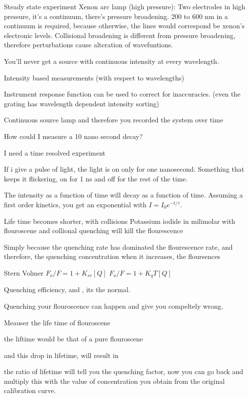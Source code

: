 	Steady state experiment
	Xenon arc lamp (high pressure): Two electrodes in high pressure, it's a continuum, there's pressure broadening. 200 to 600 nm in a continuum is required, because otherwise, the lines would correspond be xenon's electronic levels. Collisional broadening is different from pressure broadening, therefore perturbations cause alteration of wavefuntions. 

	You'll never get a source with continuous intensity at every wavelength.

	Intensity based measurements (with respect to wavelengths)

	Instrument response function can be used to correct for inaccuracies. (even the grating has wavelength dependent intensity sorting)

	Continuous source lamp and therefore you recorded the system over time

	How could I measure a 10 nano second decay?

	I need a time resolved experiment

	If i give a pulse of light, the light is on only for one nanosecond. Something that keeps it flickering, on for 1 ns and off for the rest of the time.

	The intensity as a function of time will decay as a function of time. Assuming a first order kinetics, you get an exponential with 
	$I=I_0e^{-t/\tau}$.

	Life time becomes shorter, with collisions Potassium iodide in milimolar with flouroscene and collional quenching will kill the flourescence

	Simply because the quenching rate has dominated the flourescence rate, and therefore, the quenching concentration when it increases, the floursences 

	Stern Volmer
	$F_o / F = 1 + K_{sv}[Q]$
	$F_o / F = 1 + K_qT[Q]$

	Quenching efficiency, and \tau, its the normal.

	Quenching your flouroscence can happen and give you compeltely wrong.

	Meauser the life time of flouroscene

	the liftime would be that of a pure flouroscene

	and this drop in lifetime, will result in 

	the ratio of lifetime will tell you the quenching factor, now you can go back and multiply this with the value of concentration you obtain from the original calibration curve.
